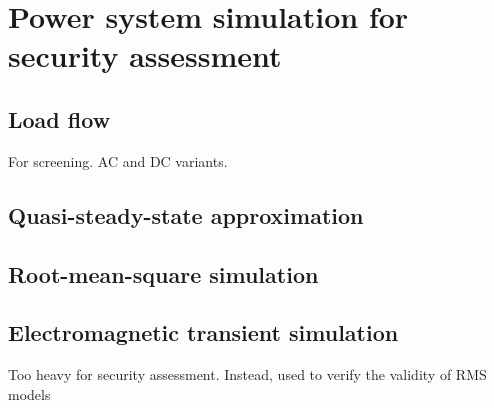 \chapter{Power system simulation for security assessment}

\section{Load flow}
For screening. AC and DC variants.
\section{Quasi-steady-state approximation}
\section{Root-mean-square simulation}
\section{Electromagnetic transient simulation}
Too heavy for security assessment. Instead, used to verify the validity of RMS models
